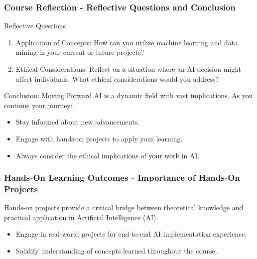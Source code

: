 \documentclass[aspectratio=169]{beamer}
\begin{document}
\begin{frame}[fragile]
    \frametitle{Course Reflection - Reflective Questions and Conclusion}
    \begin{block}{Reflective Questions}
        \begin{enumerate}
            \item Application of Concepts: How can you utilize machine learning and data mining in your current or future projects?
            \item Ethical Considerations: Reflect on a situation where an AI decision might affect individuals. What ethical considerations would you address?
        \end{enumerate}
    \end{block}

    \begin{block}{Conclusion: Moving Forward}
        AI is a dynamic field with vast implications. As you continue your journey:
        \begin{itemize}
            \item Stay informed about new advancements.
            \item Engage with hands-on projects to apply your learning.
            \item Always consider the ethical implications of your work in AI.
        \end{itemize}
    \end{block}
\end{frame}

\begin{frame}[fragile]
    \frametitle{Hands-On Learning Outcomes - Importance of Hands-On Projects}
    Hands-on projects provide a critical bridge between theoretical knowledge and practical application in Artificial Intelligence (AI).
    \begin{itemize}
        \item Engage in real-world projects for end-to-end AI implementation experience.
        \item Solidify understanding of concepts learned throughout the course.
    \end{itemize}
\end{frame}
\end{document}

